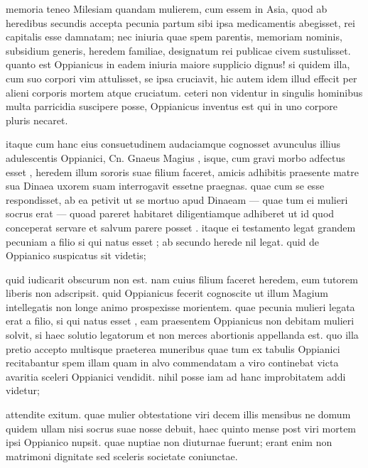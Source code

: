  memoria teneo Milesiam quandam mulierem, cum essem in Asia, quod ab heredibus secundis accepta pecunia partum sibi ipsa medicamentis abegisset, rei capitalis esse damnatam; nec iniuria quae spem parentis, memoriam nominis, subsidium generis, heredem familiae, designatum rei publicae civem sustulisset. quanto est Oppianicus in eadem iniuria maiore supplicio dignus! si quidem illa, cum suo corpori vim attulisset, se ipsa cruciavit, hic autem idem illud effecit per alieni corporis mortem atque cruciatum. ceteri non videntur in singulis hominibus multa parricidia suscipere posse, Oppianicus inventus est qui in uno corpore pluris necaret.

 itaque cum hanc eius consuetudinem audaciamque cognosset avunculus illius adulescentis Oppianici, Cn. Gnaeus Magius , isque, cum gravi morbo adfectus esset , heredem illum sororis suae filium faceret, amicis adhibitis praesente matre sua Dinaea uxorem suam interrogavit essetne praegnas. quae cum se esse respondisset, ab ea petivit ut se mortuo apud Dinaeam — quae tum ei mulieri socrus erat — quoad pareret habitaret diligentiamque adhiberet ut id quod conceperat servare et salvum parere posset . itaque ei testamento legat grandem pecuniam a filio si qui natus esset ; ab secundo herede nil legat. quid de Oppianico suspicatus sit videtis;

 quid iudicarit obscurum non est. nam cuius filium faceret heredem, eum tutorem liberis non adscripsit. quid Oppianicus fecerit cognoscite ut illum Magium intellegatis non longe animo prospexisse morientem. quae pecunia mulieri legata erat a filio, si qui natus esset , eam praesentem Oppianicus non debitam mulieri solvit, si haec solutio legatorum et non merces abortionis appellanda est. quo illa pretio accepto multisque praeterea muneribus quae tum ex tabulis Oppianici recitabantur spem illam quam in alvo commendatam a viro continebat victa avaritia sceleri Oppianici vendidit. nihil posse iam ad hanc improbitatem addi videtur;

 attendite exitum. quae mulier obtestatione viri decem illis mensibus ne domum quidem ullam nisi socrus suae nosse debuit, haec quinto mense post viri mortem ipsi Oppianico nupsit. quae nuptiae non diuturnae fuerunt; erant enim non matrimoni dignitate sed sceleris societate coniunctae.

